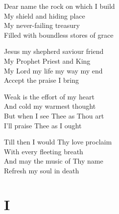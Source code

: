 \documentclass[aspectratio=169]{beamer}
\begin{document}
{\begin{frame}{}
\end{frame}
\hypertarget{How sweet the name of Jesus sounds[]3}{}
\begin{frame}{}
\fontsize{23.076923076923077}{27.69230769230769}\selectfont

Dear name the rock on which I build\\ 
My shield and hiding place\\ 
My never-failing treasury\\ 
Filled with boundless stores of grace

\end{frame}
\hypertarget{How sweet the name of Jesus sounds[]4}{}
\begin{frame}{}
\fontsize{23.076923076923077}{27.69230769230769}\selectfont

Jesus my shepherd saviour friend\\ 
My Prophet Priest and King\\ 
My Lord my life my way my end\\ 
Accept the praise I bring

\end{frame}
\hypertarget{How sweet the name of Jesus sounds[]5}{}
\begin{frame}{}
\fontsize{23.076923076923077}{27.69230769230769}\selectfont

Weak is the effort of my heart\\ 
And cold my warmest thought\\ 
But when I see Thee as Thou art\\ 
I'll praise Thee as I ought

\end{frame}
\hypertarget{How sweet the name of Jesus sounds[]6}{}
\begin{frame}{}
\fontsize{23.076923076923077}{27.69230769230769}\selectfont

Till then I would Thy love proclaim\\ 
With every fleeting breath\\ 
And may the music of Thy name\\ 
Refresh my soul in death

\end{frame}
}

\section{ I }
\end{document}
